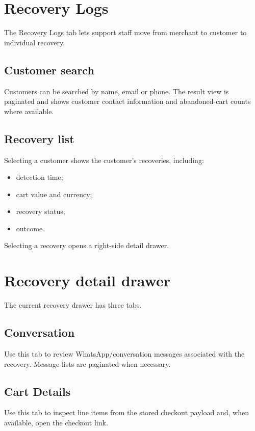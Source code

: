 \section{Recovery Logs}
The Recovery Logs tab lets support staff move from merchant to customer to individual recovery.

\subsection{Customer search}
Customers can be searched by name, email or phone. The result view is paginated and shows customer contact information and abandoned-cart counts where available.


\subsection{Recovery list}
Selecting a customer shows the customer's recoveries, including:
\begin{itemize}
  \item detection time;
  \item cart value and currency;
  \item recovery status;
  \item outcome.
\end{itemize}

Selecting a recovery opens a right-side detail drawer.

\section{Recovery detail drawer}
The current recovery drawer has three tabs.

\subsection{Conversation}
Use this tab to review WhatsApp/conversation messages associated with the recovery. Message lists are paginated when necessary.


\subsection{Cart Details}
Use this tab to inspect line items from the stored checkout payload and, when available, open the checkout link.

